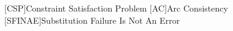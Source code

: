 \begin{acronym}
    [CSP]{Constraint Satisfaction Problem}
    [AC]{Arc Consistency}
    [SFINAE]{Substitution Failure Is Not An Error}
\end{acronym}